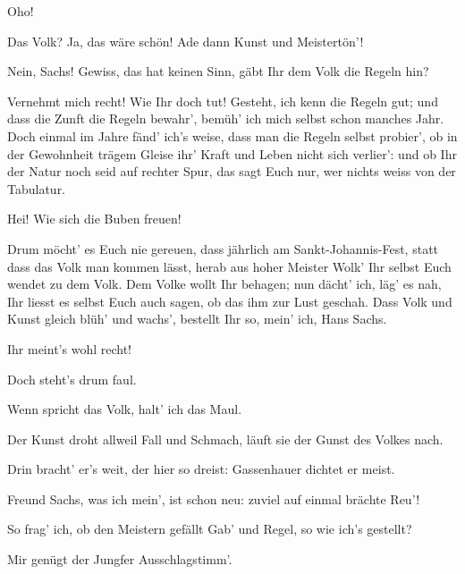 \begin{drama}
Oho!



Das Volk? Ja, das wäre schön!
Ade dann Kunst und Meistertön'!

\Kothnerspeaks
Nein, Sachs! Gewiss, das hat keinen Sinn,
gäbt Ihr dem Volk die Regeln hin?

\Sachsspeaks
Vernehmt mich recht! Wie Ihr doch tut!
Gesteht, ich kenn die Regeln gut;
und dass die Zunft die Regeln bewahr',
bemüh' ich mich selbst schon manches Jahr.
Doch einmal im Jahre fänd' ich's weise,
dass man die Regeln selbst probier',
ob in der Gewohnheit trägem Gleise
ihr' Kraft und Leben nicht sich verlier':
und ob Ihr der Natur noch seid auf rechter Spur,
das sagt Euch nur,
wer nichts weiss von der Tabulatur.


\Beckmesserspeaks
Hei! Wie sich die Buben freuen!

\Sachsspeaks
{}

Drum möcht' es Euch nie gereuen,
dass jährlich am Sankt-Johannis-Fest,
statt dass das Volk man kommen lässt,
herab aus hoher Meister Wolk'
Ihr selbst Euch wendet zu dem Volk.
Dem Volke wollt Ihr behagen;
nun dächt' ich, läg' es nah,
Ihr liesst es selbst Euch auch sagen,
ob das ihm zur Lust geschah.
Dass Volk und Kunst gleich blüh' und wachs',
bestellt Ihr so, mein' ich, Hans Sachs.

\Vogelgesangspeaks
Ihr meint's wohl recht!

\Kothnerspeaks
Doch steht's drum faul.

\Nachtigallspeaks
Wenn spricht das Volk, halt' ich das Maul.

\Kothnerspeaks
Der Kunst droht allweil Fall und Schmach,
läuft sie der Gunst des Volkes nach.

\Beckmesserspeaks
Drin bracht' er's weit, der hier so dreist:
Gassenhauer dichtet er meist.

\Pognerspeaks
Freund Sachs, was ich mein', ist schon neu:
zuviel auf einmal brächte Reu'!


So frag' ich, ob den Meistern gefällt
Gab' und Regel, so wie ich's gestellt?


\Sachsspeaks
Mir genügt der Jungfer Ausschlagstimm'.


\end{drama}
